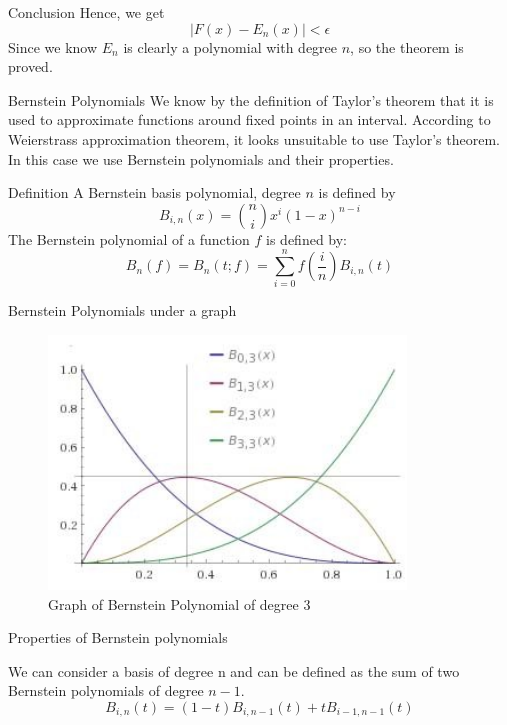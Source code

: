 \documentclass{beamer}
\begin{document}
\begin{frame}{Conclusion}
Hence, we get
\begin{equation*}
    |F(x)-E_n(x)|<\epsilon
\end{equation*}
Since we know $E_n$ is clearly a polynomial with degree $n$, so the theorem is proved.
\end{frame}

\begin{frame}{Bernstein Polynomials}
We know by the definition of Taylor's theorem that it is used to approximate functions around fixed points in an interval. According to Weierstrass approximation theorem, it looks unsuitable to use Taylor's theorem. In this case we use Bernstein polynomials and their properties.    
\end{frame}

\begin{frame}{Definition}
A Bernstein basis polynomial, degree $n$ is defined by
\begin{equation}
\label{eq:bp:1}
 B_{i,n}(x)=\binom{n}{i}x^i(1-x)^{n-i} 
\end{equation}
The Bernstein polynomial of a function $f$ is defined by:
\begin{equation}
B_n(f)=B_n(t;f)=\sum_{i=0}^nf(\frac{i}{n})B_{i,n}(t)   
\end{equation}    
\end{frame}
\begin{frame}{Bernstein Polynomials under a graph}
\begin{figure}
    \centering
    \includegraphics[width=95mm]{BP.jpg}
    \caption{Graph of Bernstein Polynomial of degree 3}
    \label{fig:1}
\end{figure}    
\end{frame}
\begin{frame}{Properties of Bernstein polynomials}
\begin{theorem}
We can consider a basis of degree n and can be defined as the sum of two Bernstein polynomials of degree $n-1$.
\begin{equation*}
B_{i,n}(t)=(1-t)B_{i,n-1}(t)+tB_{i-1,n-1}(t)    
\end{equation*}
\end{theorem}
\end{frame}
\end{document}

